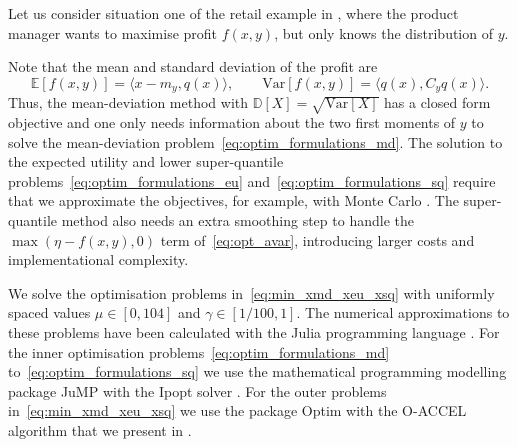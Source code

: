\documentclass[main.tex]{subfiles}
\begin{document}
\begin{example}
  Let us consider situation one of the retail example in
  , where the product manager wants
  to maximise profit $f(x,y)$, but only knows the distribution of $y$.

  Note that the mean and standard deviation of the profit are
  \begin{equation}
    \mathbb{E}[f(x,y)]
    = \langle x-m_y,q(x) \rangle,\qquad
    \mbox{Var}[f(x,y)]
    = \langle q(x),C_y q(x) \rangle.
  \end{equation}
  Thus, the mean-deviation method with
  $\mathbb{D}[X]=\sqrt{\mbox{Var}[X]}$ has a closed form objective and
  one only needs information about the two first moments of $y$ to solve
  the mean-deviation problem~\eqref{eq:optim_formulations_md}.
  The solution to the expected utility and lower super-quantile
  problems~\eqref{eq:optim_formulations_eu}
  and~\eqref{eq:optim_formulations_sq} require that we approximate the
  objectives, for example, with Monte Carlo
  \citep{caflisch1998monte}.
  The super-quantile method also needs an extra smoothing step to
  handle the $\max(\eta-f(x,y),0)$ term of~\eqref{eq:opt_avar},
  introducing larger costs and implementational complexity.

  We solve the optimisation problems in~\eqref{eq:min_xmd_xeu_xsq} with
  uniformly spaced values $\mu\in[0,104]$ and $\gamma\in[1/100, 1]$.
  The numerical approximations to these problems have been calculated
  with the Julia programming language \citep{bezanson2017julia}.
  For the inner optimisation problems~\eqref{eq:optim_formulations_md}
  to~\eqref{eq:optim_formulations_sq} we use the mathematical
  programming modelling package JuMP
  \citep{dunning2017jump} with the Ipopt solver
  \citep{wachter2006implementation}. For the outer
  problems in~\eqref{eq:min_xmd_xeu_xsq} we use the package Optim
  \citep{mogensen2018optim} with the O-ACCEL algorithm that we
  present in .


\end{example}
\end{document}
